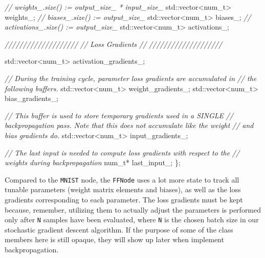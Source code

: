 \documentclass[
]{article}
\newenvironment{Shaded}{}{}
\newcommand{\BuiltInTok}[1]{#1}
\newcommand{\CommentTok}[1]{\textcolor[rgb]{0.38,0.63,0.69}{\textit{#1}}}
\newcommand{\DataTypeTok}[1]{\textcolor[rgb]{0.56,0.13,0.00}{#1}}
\newcommand{\NormalTok}[1]{#1}
\newcommand{\VariableTok}[1]{\textcolor[rgb]{0.10,0.09,0.49}{#1}}
\begin{document}
\begin{Shaded}
\begin{Highlighting}[]
    \CommentTok{// weights\_.size() := output\_size\_ * input\_size\_}
    \BuiltInTok{std::}\NormalTok{vector\textless{}}\DataTypeTok{num\_t}\NormalTok{\textgreater{} }\VariableTok{weights\_}\NormalTok{;}
    \CommentTok{// biases\_.size() := output\_size\_}
    \BuiltInTok{std::}\NormalTok{vector\textless{}}\DataTypeTok{num\_t}\NormalTok{\textgreater{} }\VariableTok{biases\_}\NormalTok{;}
    \CommentTok{// activations\_.size() := output\_size\_}
    \BuiltInTok{std::}\NormalTok{vector\textless{}}\DataTypeTok{num\_t}\NormalTok{\textgreater{} }\VariableTok{activations\_}\NormalTok{;}

    \CommentTok{////////////////////}
    \CommentTok{// Loss Gradients //}
    \CommentTok{////////////////////}

    \BuiltInTok{std::}\NormalTok{vector\textless{}}\DataTypeTok{num\_t}\NormalTok{\textgreater{} }\VariableTok{activation\_gradients\_}\NormalTok{;}

    \CommentTok{// During the training cycle, parameter loss gradients are accumulated in}
    \CommentTok{// the following buffers.}
    \BuiltInTok{std::}\NormalTok{vector\textless{}}\DataTypeTok{num\_t}\NormalTok{\textgreater{} }\VariableTok{weight\_gradients\_}\NormalTok{;}
    \BuiltInTok{std::}\NormalTok{vector\textless{}}\DataTypeTok{num\_t}\NormalTok{\textgreater{} }\VariableTok{bias\_gradients\_}\NormalTok{;}

    \CommentTok{// This buffer is used to store temporary gradients used in a SINGLE}
    \CommentTok{// backpropagation pass. Note that this does not accumulate like the weight}
    \CommentTok{// and bias gradients do.}
    \BuiltInTok{std::}\NormalTok{vector\textless{}}\DataTypeTok{num\_t}\NormalTok{\textgreater{} }\VariableTok{input\_gradients\_}\NormalTok{;}

    \CommentTok{// The last input is needed to compute loss gradients with respect to the}
    \CommentTok{// weights during backpropagation}
    \DataTypeTok{num\_t}\NormalTok{* }\VariableTok{last\_input\_}\NormalTok{;}
\NormalTok{\};}
\end{Highlighting}
\end{Shaded}

Compared to the \texttt{MNIST} node, the \texttt{FFNode} uses a lot more
state to track all tunable parameters (weight matrix elements and
biases), as well as the loss gradients corresponding to each parameter.
The loss gradients must be kept because, remember, utilizing them to
actually adjust the parameters is performed only after \texttt{N}
samples have been evaluated, where \texttt{N} is the chosen batch size
in our stochastic gradient descent algorithm. If the purpose of some of
the class members here is still opaque, they will show up later when
implement backpropagation.
\end{document}
